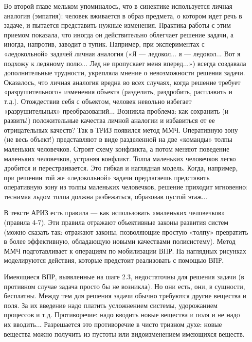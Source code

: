 Во  второй главе  мельком  упоминалось, что  в синектике  используется
личная  аналогия  (эмпатия): человек  вживается  в  образ предмета,  о
котором идет речь  в задаче, и пытается  представить нужные изменения.
Практика работы с  этим приемом показала, что  иногда он действительно
облегчает  решение  задачи,  а  иногда,  напротив,  заводит  в  тупик.
Например, при  экспериментах с  «ледокольной» задачей  личная аналогия
(«Я  — ледокол...  я —  ледокол... Вот  я подхожу  к ледяному  полю...
Лед  не пропускает  меня вперед...»)  всегда создавала  дополнительные
трудности, укрепляла мнение о невозможности решения задачи. Оказалось,
что  личная аналогия  вредна во  всех случаях,  когда решение  требует
«разрушительного» изменения объекта (разделить, раздробить, расплавить
и  т.д.).  Отождествив  себя  с объектом,  человек  невольно  избегает
«разрушительных» преобразований... Возникла проблема: как сохранить (и
развить!) положительные  качества личной  аналогии и избавиться  от ее
отрицательных  качеств? Так  в  ТРИЗ появился  метод ММЧ.  Оперативную
зону  (не  весь  объект!)  представляют  в  виде  разделенной  на  две
«команды»  толпы  маленьких  человечков.  Строят  схему  конфликта,  а
потом меняют поведение маленьких  человечков, устраняя конфликт. Толпа
маленьких человечков  легко дробится  и перестраивается. Это  гибкая и
наглядная модель.  Когда, например,  при решении той  же «ледокольной»
задачи  предлагаешь представить  оперативную зону  из толпы  маленьких
человечков, решение  приходит мгновенно:  теснимая льдом  толпа должна
разбежаться, образовав пустой этаж...

В тексте АРИЗ  есть правила — как  использовать «маленьких человечков»
(правила  4-7).  Эти  правила  отражают  объективные  законы  развития
систем  (можно  сказать  так:  отражают  законы,  позволяющие  простую
«толпу» превратить  в более эффективную, обладающую  новыми качествами
полисистему).  Метод ММЧ  подготавливает  к  операциям по  мобилизации
ВПР. На  наглядных рисунках  моделируются действия,  которые предстоит
реализовать с помощью ВПР.

Имеющиеся ВПР, выявленные на шаге 2.3, недостаточны для решения задачи
(в противном случае задача просто бы не возникла). Но они есть, они, в
сущности,  бесплатны. Между  тем для  решения задачи  обычно требуются
другие  вещества  и поля.  За  их  введение надо  платить  усложнением
системы, удорожанием процессов и т.д. Противоречие: надо вводить новые
вещества и поля и не надо их вводить... Разрешается это противоречие в
чисто  тризном духе:  новые  вещества можно  получить  из пустоты  или
видоизменением имеющихся веществ.

